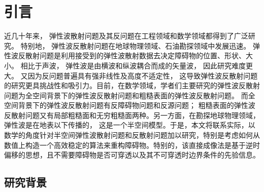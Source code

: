 \chapter{引言}\label{chap:introduction}
近几十年来， 弹性波散射问题及其反问题在工程领域和数学领域都得到了广泛研究\cite{landau}。 特别地， 弹性波反散射问题在地球物理领域、石油勘探领域中发展迅速。
弹性波反散射问题是利用接受到的弹性波散射数据去决定障碍物的位置、形状、大小。 相比于声波， 弹性波是由横波和纵波耦合而成的矢量波， 因此研究难度更大。 又因为反问题普遍具有强非线性及高度不适定性， 这导致弹性波反散射问题的研究更具挑战性和吸引力。目前，在数学领域，学者们主要研究的弹性波反散射问题为全空间背景下的弹性波反散射问题\cite{bonnet2005inverse,bao2018inverse}和粗糙表面的弹性波反散射问题\cite{liu2019near}。 而全空间背景下的弹性波反散射问题有反障碍物问题和反源问题； 粗糙表面的弹性波反散射问题又有局部粗糙面和无穷粗糙面两种。另一方面，在勘探地球物理领域， 弹性波是在地表以下传播的， 这是一个半空间模型。于是，本文将联系实际，以数学的角度针对半空间弹性波散射问题和反散射问题加以研究，特别是考虑如何从数值上构造一个高效稳定的算法来重构障碍物。特别的，该直接成像法是基于逆时偏移的思想，且不需要障碍物是否可穿透以及其不可穿透时边界条件的先验信息。
\section{研究背景}



